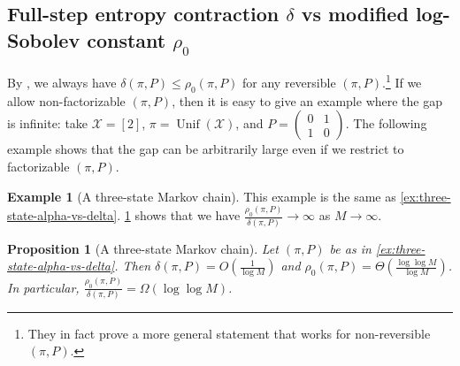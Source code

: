 \documentclass[11pt]{article}
\def\cX{\mathcal{X}}
\DeclareMathOperator\Unif{\mathrm{Unif}}
\newcommand{\nbyp}[1]{{\color{red}[Yury: #1]}}
\newtheorem{proposition}[theorem]{Proposition}
\theoremstyle{definition}
\newtheorem{example}[theorem]{Example}
\begin{document}
\subsection{Full-step entropy contraction \texorpdfstring{$\delta$}{delta} vs modified log-Sobolev constant \texorpdfstring{$\rho_0$}{rho0}} \label{sec:comparison:delta-vs-rho0}
By \cite[Lemma 2.7]{blanca2021entropy}, we always have $\delta(\pi, P) \le \rho_0(\pi, P)$ for any reversible
$(\pi, P)$.\footnote{They in fact prove a more general statement that works for non-reversible $(\pi, P)$.}
If we allow non-factorizable $(\pi, P)$, then it is easy to give an example where the gap is infinite: take $\cX=[2]$, $\pi=\Unif(\cX)$, and $P=\begin{pmatrix}
  0 & 1 \\ 1 & 0
\end{pmatrix}$.
The following example shows that the gap can be arbitrarily large even if we restrict to factorizable $(\pi, P)$.
\begin{example}[A three-state Markov chain] \label{ex:three-state-delta-vs-rho0}
  This example is the same as \cref{ex:three-state-alpha-vs-delta}.
  \cref{prop:three-state-delta-vs-rho0} shows that we have $\frac{\rho_0(\pi, P)}{\delta(\pi, P)} \to \infty$ as $M\to \infty$.
\end{example}
\begin{proposition}[A three-state Markov chain] \label{prop:three-state-delta-vs-rho0}
  Let $(\pi, P)$ be as in \cref{ex:three-state-alpha-vs-delta}.
  Then $\delta(\pi, P) = O\left(\frac 1{\log M}\right)$ and $\rho_0(\pi, P) = \Theta\left(\frac{\log \log M}{\log M}\right)$.
  In particular, $\frac{\rho_0(\pi, P)}{\delta(\pi, P)} = \Omega(\log \log M)$.
\end{proposition}
\end{document}
